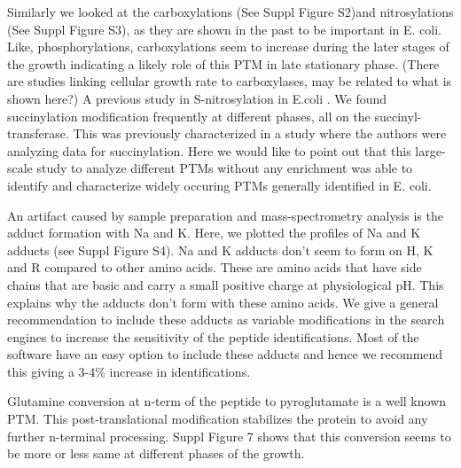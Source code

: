 \documentclass[12pt]{article}
\begin{document}
Similarly we looked at the carboxylations (See Suppl Figure S2)and nitrosylations (See Suppl Figure S3), as they are shown in the past to be important in E. coli. Like, phosphorylations, carboxylations seem to increase during the later stages of the growth indicating a likely role of this PTM in late stationary phase. (There are studies linking cellular growth rate to carboxylases, may be related to what is shown here?) A previous study in S-nitrosylation in E.coli \cite{Sethetal2012}. We found succinylation modification frequently at different phases, all on the succinyl-transferase. This was previously characterized in a study where the authors were analyzing data for succinylation. Here we would like to point out that this large-scale study to analyze different PTMs without any enrichment was able to identify and characterize widely occuring PTMs generally identified in E. coli. 

An artifact caused by sample preparation and mass-spectrometry analysis is the adduct formation with Na and K. Here, we plotted the profiles of Na and K adducts (see Suppl Figure S4). Na and K adducts don't seem to form on H, K and R compared to other amino acids. These are amino acids that have side chains that are basic and carry a small positive charge at physiological pH. This explains why the adducts don't form with these amino acids. We give a general recommendation to include these adducts as variable modifications in the search engines to increase the sensitivity of the peptide identifications. Most of the software have an easy option to include these adducts and hence we recommend this giving a 3-4\% increase in identifications.

Glutamine conversion at n-term of the peptide to pyroglutamate is a well known PTM. This post-translational modification stabilizes the protein to avoid any further n-terminal processing. Suppl Figure 7 shows that this conversion seems to be more or less same at different phases of the growth.
\end{document}
